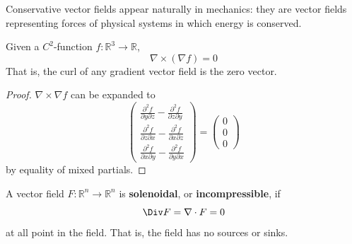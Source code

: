   Conservative vector fields appear naturally in mechanics: they are vector fields representing forces of physical systems in which energy is conserved. 

  \begin{theorem}
		Given a $C^2$-function $f: \mathbb{R}^3 \longrightarrow \mathbb{R}$,
		\begin{equation}
			\nabla \times ( \nabla f) = 0
		\end{equation}
		That is, the curl of any gradient vector field is the zero vector. 
  \end{theorem}
  \begin{proof}
		$\nabla \times \nabla f$ can be expanded to
		\begin{equation} 
			\begin{pmatrix}
				\frac{\partial^2 f}{\partial y \partial z} - \frac{\partial^2 f}{\partial z \partial y} \\ 
				\frac{\partial^2 f}{\partial z \partial x} - \frac{\partial^2 f}{\partial x \partial z} \\
				\frac{\partial^2 f}{\partial x \partial y} - \frac{\partial^2 f}{\partial y \partial x}
			\end{pmatrix} = \begin{pmatrix}
			  0 \\ 0 \\ 0
			\end{pmatrix}
		\end{equation}
		by equality of mixed partials. 
  \end{proof}

  \begin{definition}
		A vector field $F: \mathbb{R}^n \longrightarrow \mathbb{R}^n$ is \textbf{solenoidal}, or \textbf{incompressible}, if 
		\begin{equation}
			\Div F = \nabla \cdot F = 0
		\end{equation}
		at all point in the field. That is, the field has no sources or sinks. 
  \end{definition}

